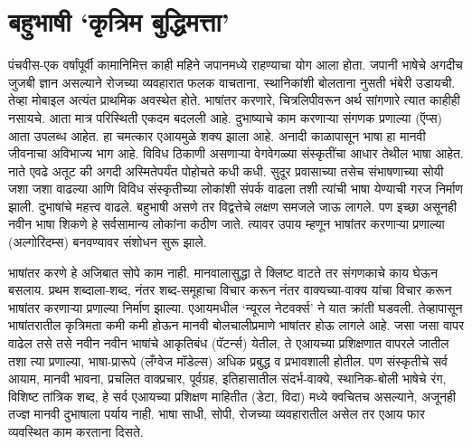 \chapter{बहुभाषी `कृत्रिम बुद्धिमत्ता'}

पंचवीस-एक वर्षांपूर्वी कामानिमित्त काही महिने जपानमध्ये राहण्याचा योग आला होता. जपानी भाषेचे अगदीच जुजबी ज्ञान असल्याने रोजच्या व्यवहारात फलक वाचताना, स्थानिकांशी बोलताना नुसती भंबेरी उडायची. तेव्हा मोबाइल अत्यंत प्राथमिक अवस्थेत होते. भाषांतर करणारे, चित्रलिपीवरून अर्थ सांगणारे त्यात काहीही नसायचे. आता मात्र परिस्थिती एकदम बदलली आहे. दुभाष्याचे काम करणाऱ्या संगणक प्रणाल्या (ऍप्स) आता उपलब्ध आहेत. हा चमत्कार एआयमुळे शक्य झाला आहे.  अनादी काळापासून भाषा हा मानवी जीवनाचा अविभाज्य भाग आहे. विविध ठिकाणी असणाऱ्या वेगवेगळ्या संस्कृतींचा आधार तेथील भाषा आहेत. नाते एवढे अतूट की अगदी अस्मितेपर्यंत पोहोचते कधी कधी. सुदूर प्रवासाच्या तसेच संभाषणाच्या सोयी जशा जशा वाढल्या आणि विविध संस्कृतीच्या लोकांशी संपर्क वाढला तशी त्यांची भाषा येण्याची गरज निर्माण झाली. दुभाषांचे महत्त्व वाढले. बहुभाषी असणे तर विद्वत्तेचे लक्षण समजले जाऊ लागले. पण इच्छा असूनही नवीन भाषा शिकणे हे सर्वसामान्य लोकांना कठीण जाते. त्यावर उपाय म्हणून भाषांतर करणाऱ्या प्रणाल्या (अल्गोरिदम्स) बनवण्यावर संशोधन सुरू झाले.

भाषांतर करणे हे अजिबात सोपे काम नाही. मानवालासुद्धा ते क्लिष्ट वाटते तर संगणकाचे काय घेऊन बसलाय. प्रथम शब्दाला-शब्द, नंतर शब्द-समूहाचा विचार करून नंतर वाक्यच्या-वाक्य यांचा विचार करून भाषांतर करणाऱ्या प्रणाल्या निर्माण झाल्या. एआयमधील `न्यूरल नेटवर्क्स' ने यात क्रांती घडवली. तेव्हापासून भाषांतरातील कृत्रिमता कमी कमी होऊन मानवी बोलचालीप्रमाणे भाषांतर होऊ लागले आहे. जसा जसा वापर वाढेल तसे तसे नवीन नवीन भाषांचे आकृतिबंध (पॅटर्न्स) येतील, ते एआयच्या प्रशिक्षणात वापरले जातील तशा त्या प्रणाल्या, भाषा-प्रारूपे (लँग्वेज मॉडेल्स) अधिक प्रबुद्ध व प्रभावशाली होतील. पण संस्कृतीचे सर्व आयाम, मानवी भावना, प्रचलित वाक्प्रचार, पूर्वग्रह, इतिहासातील संदर्भ-वाक्ये, स्थानिक-बोली भाषेचे रंग, विशिष्ट तांत्रिक  शब्द, हे सर्व एआयच्या प्रशिक्षण माहितीत (डेटा, विदा) मध्ये क्वचितच असल्याने, अजूनही तज्ज्ञ मानवी दुभाषाला पर्याय नाही. भाषा साधी, सोपी, रोजच्या व्यवहारातील असेल तर एआय फार व्यवस्थित काम करताना दिसते.  

